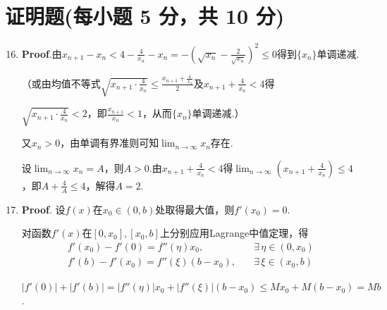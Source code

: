 \documentclass[../Main.tex]{subfiles}
\begin{document}
\section{证明题(每小题 5 分，共 10 分)}
\begin{enumerate}
    \setcounter{enumi}{15}
    \item \textbf{Proof}.由$x_{n+1}-x_{n}<4-\frac{4}{x_{n}}-x_{n}=-\left(\sqrt{x_{n}}
              -\frac{2}{\sqrt{x_{n}}}\right)^{2}\leq0$得到$\{x_{n}\}$单调递减.

          （或由均值不等式$\sqrt{x_{n+1}\cdot\frac{4}{x_n}}\leq\frac{x_{n+1}+\frac{4}{x_n}}{2}$及$x
                  _{n+1}+\frac{4}{x_{n}}<4$得

          $\sqrt{x_{n+1}\cdot\frac{4}{x_n}}<2$，即$\frac{x_{n+1}}{x_{n}}<1$，从而$\{x
                  _{n}\}$单调递减.）

          又$x_{n}>0$，由单调有界准则可知$\lim_{n\to\infty}x_{n}$存在.

          设$\lim_{n\to\infty}x_{n}=A$，则$A>0$.由$x_{n+1}+\frac{4}{x_{n}}<4$得$\lim_{n\to\infty}
              \left(x_{n+1}+\frac{4}{x_{n}}\right)\leq 4$，即$A+\frac{4}{A}\leq4$，解得$A
              =2$.

    \item \textbf{Proof}. 设$f(x)$在$x_{0}\in(0,b)$处取得最大值，则$f'(x_{0}
              )=0$.

          对函数$f'(x)$在$[0,x_{0}],[x_{0},b]$上分别应用Lagrange中值定理，得
          \[
              \begin{aligned}
                  f'(x_{0})-f'(0)=f''(\eta)x_{0},\quad    & \exists\,\eta\in(0,x_{0}) \\
                  f'(b)-f'(x_{0})=f''(\xi)(b-x_{0}),\quad & \exists\,\xi\in(x_{0},b)
              \end{aligned}
          \]

          $|f'(0)|+|f'(b)|=|f''(\eta)|x_{0}+|f''(\xi)|(b-x_{0})\leq Mx_{0}+M(b-x_{0})
              =Mb$.
\end{enumerate}
\end{document}
